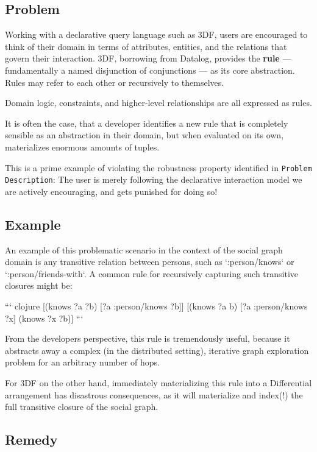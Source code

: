 \documentclass[../catalog.tex]{subfiles}
\begin{document}
\subsection{Problem}

Working with a declarative query language such as 3DF, users are
encouraged to think of their domain in terms of attributes, entities,
and the relations that govern their interaction. 3DF, borrowing from
Datalog, provides the \textbf{rule} — fundamentally a named disjunction of
conjunctions — as its core abstraction. Rules may refer to each other
or recursively to themselves.

Domain logic, constraints, and higher-level relationships are all
expressed as rules.

It is often the case, that a developer identifies a new rule that is
completely sensible as an abstraction in their domain, but when
evaluated on its own, materializes enormous amounts of tuples. 

This is a prime example of violating the robustness property
identified in \texttt{Problem Description}: The user is merely following
the declarative interaction model we are actively encouraging, and
gets punished for doing so!

\subsection{Example}

An example of this problematic scenario in the context of the social
graph domain is any transitive relation between persons, such as
`:person/knows` or `:person/friends-with`. A common rule for
recursively capturing such transitive closures might be:

``` clojure
[(knows ?a ?b) [?a :person/knows ?b]]
[(knows ?a b) [?a :person/knows ?x] (knows ?x ?b)]
```

From the developers perspective, this rule is tremendously useful,
because it abstracts away a complex (in the distributed setting),
iterative graph exploration problem for an arbitrary number of hops.

For 3DF on the other hand, immediately materializing this rule into a
Differential arrangement has disastrous consequences, as it will
materialize and index(!) the full transitive closure of the social
graph.

\subsection{Remedy}
\end{document}
